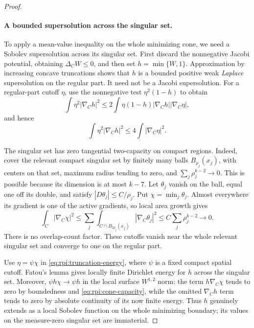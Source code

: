\begin{proof}
\paragraph{A bounded supersolution across the singular set.}
To apply a mean-value inequality on the whole minimizing cone, we
need a Sobolev supersolution across its singular set. First discard
the nonnegative Jacobi potential, obtaining $\Delta_CW\le0$, and
then set $h=\min\{W,1\}$. Approximation by increasing concave truncations
shows that $h$ is a bounded positive weak \emph{Laplace}
supersolution on the regular part. It need not be a Jacobi
supersolution. For a regular-part cutoff $\eta$, use the nonnegative
test $\eta^2(1-h)$ to obtain
\[
 \int\eta^2|\nabla_C h|^2
 \le2\int\eta(1-h)|\nabla_C h||\nabla_C\eta|,
\]
and hence
\begin{equation}\label{eq:rpi:truncation-energy}
 \int\eta^2|\nabla_C h|^2
       \le4\int|\nabla_C\eta|^2.
\end{equation}

The singular set has zero tangential two-capacity on compact regions.
Indeed, cover the relevant compact singular set by finitely many balls
$B_{\rho_j}(x_j)$, with centers on that set, maximum radius tending
to zero, and $\sum_j\rho_j^{k-2}\to0$. This is possible because
its dimension is at most $k-7$. Let $\theta_j$ vanish on the ball,
equal one off its double, and satisfy $|D\theta_j|\le C/\rho_j$.
Put $\chi=\min_j\theta_j$. Almost everywhere its gradient is one
of the active gradients, so local area growth gives
\begin{equation}\label{eq:rpi:cone-capacity}
 \int_C|\nabla_C\chi|^2
 \le\sum_j\int_{C\cap B_{2\rho_j}(x_j)}|\nabla_C\theta_j|^2
 \le C\sum_j\rho_j^{k-2}\longrightarrow0.
\end{equation}
There is no overlap-count factor. These cutoffs vanish near the
whole relevant singular set and converge to one on the regular part.

Use $\eta=\psi\chi$ in \eqref{eq:rpi:truncation-energy}, where
$\psi$ is a fixed compact spatial cutoff. Fatou's lemma gives
locally finite Dirichlet energy for $h$ across the singular set.
Moreover, $\psi h\chi\to\psi h$ in the local surface
$W^{1,2}$ norm: the term $h\nabla_C\chi$ tends to zero by
boundedness and \eqref{eq:rpi:cone-capacity}, while the omitted
$\nabla_C h$ term tends to zero by absolute continuity of its
now finite energy. Thus $h$ genuinely extends as a local Sobolev
function on the whole minimizing boundary; its values on the
measure-zero singular set are immaterial.


\end{proof}
